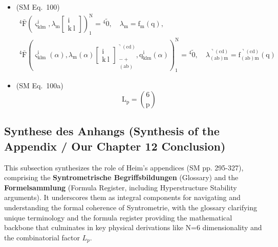 \documentclass[12pt]{article}
\begin{document}
\begin{itemize}[label={},leftmargin=0pt]
    \item (SM Eq.\ 100) 
    \[
    \begin{gathered}
    {}^4\bar{\mathrm{F}}\left( \varsigma^\mathrm{i}_{\mathrm{klm}}, \lambda_\mathrm{m} \left[ \begin{smallmatrix} \mathrm{i} \\ \mathrm{k\ l} \end{smallmatrix} \right] \right)_1^\mathrm{N} = {}^4\tilde{0}, \quad \lambda_\mathrm{m} = \mathrm{f_m}(\mathrm{q}), \\
    {}^4\bar{\mathrm{F}}\left( \varsigma^\mathrm{i}_{\mathrm{klm}}(\alpha), \lambda_\mathrm{m}(\alpha) \left[ \begin{smallmatrix} \mathrm{i} \\ \mathrm{k\ l} \end{smallmatrix} \right]^{\urcorner(\mathrm{cd})}_{\substack{- + \\ (\mathrm{ab})}}, \mathrm{q}^\mathrm{i}_{\mathrm{klm}}(\alpha) \right)_1^\mathrm{N} = {}^4\tilde{0}, \quad \lambda^{\urcorner(\mathrm{cd})}_{(\mathrm{ab})\mathrm{m}} = \mathrm{f}^{\urcorner(\mathrm{cd})}_{(\mathrm{ab})\mathrm{m}}(\mathrm{q})
    \end{gathered}
    \]

    \item (SM Eq.\ 100a) 
    \[
    \mathrm{L_p} = \binom{6}{\mathrm{p}}
    \]
\end{itemize} 
\subsection{Synthese des Anhangs (Synthesis of the Appendix / Our Chapter 12 Conclusion)}
\label{sec:appendix_synthesis}

This subsection synthesizes the role of Heim's appendices (SM pp. 295-327), comprising the \textbf{Syntrometrische Begriffsbildungen} (Glossary) and the \textbf{Formelsammlung} (Formula Register, including Hyperstructure Stability arguments). It underscores them as integral components for navigating and understanding the formal coherence of Syntrometrie, with the glossary clarifying unique terminology and the formula register providing the mathematical backbone that culminates in key physical derivations like N=6 dimensionality and the combinatorial factor \(L_p\).
\end{document}

